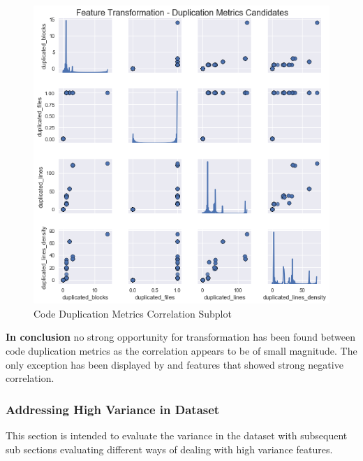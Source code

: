 \begin{figure}
    \centering
    \includegraphics[scale=0.75]{Figures/correlation/Attribute_Relationship_in_Duplication_Metrics.png}
    \caption{Code Duplication Metrics Correlation Subplot}
    \label{fig:correlation-code-duplication-metrics-subplot}
\end{figure}


\textbf{In conclusion} no strong opportunity for transformation has been found between code duplication metrics as the correlation appears to be of small magnitude. The only exception has been displayed by \duplicatedBlocks{} and \duplicatedFiles{} features that showed strong negative correlation.
\FloatBarrier

\subsubsection{Addressing High Variance in Dataset}\label{sec:impl-data-analysis:dealing-with-variance}
This section is intended to evaluate the variance in the dataset with subsequent sub sections evaluating different ways of dealing with high variance features.